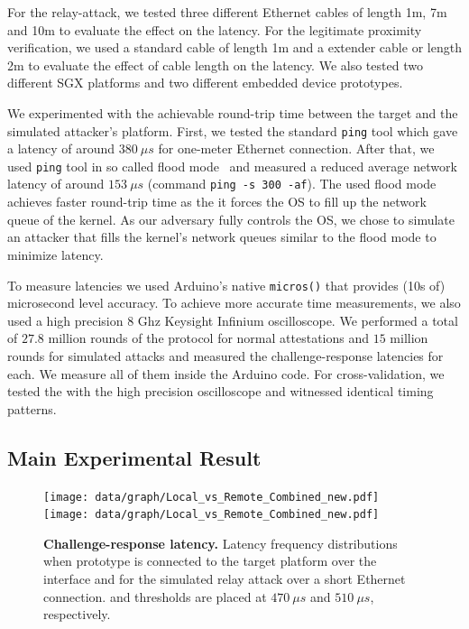 For the relay-attack, we tested three different Ethernet cables of length 1m, 7m and 10m to evaluate the effect on the latency. For the legitimate proximity verification, we used a standard \usb cable of length 1m and a \usb extender cable or length 2m to evaluate the effect of \usb cable length on the latency. We also tested two different SGX platforms and two different embedded device prototypes.

We experimented with the achievable round-trip time between the target and the simulated attacker's platform. First, we tested the standard \texttt{ping} tool which gave a latency of around $380\ \mu s$ for one-meter Ethernet connection. After that, we used \texttt{ping} tool in so called flood mode~\cite{ping} and measured a reduced average network latency of around $153\ \mu s$ (command \texttt{ping -s 300 -af}). The used flood mode achieves faster round-trip time as the it forces the OS to fill up the network queue of the kernel. As our adversary fully controls the OS, we chose to simulate an attacker that fills the kernel's network queues similar to the flood mode to minimize latency.

To measure latencies we used Arduino's native \texttt{micros()} that provides (10s of) microsecond level accuracy. To achieve more accurate time measurements, we also used a high precision 8 Ghz Keysight Infinium oscilloscope. We performed a total of $27.8$ million rounds of the protocol for normal attestations and $15$ million rounds for simulated attacks and measured the challenge-response latencies for each. We measure all of them inside the Arduino code. For cross-validation, we tested the \device with the high precision oscilloscope and witnessed identical timing patterns.

\ifusenix
\vspace{-5pt}
\else
\fi
\subsection{Main Experimental Result}
\label{sec:evaluation:results}


\begin{figure}[t]
  \centering
    \ifusenix
    \texttt{[image: data/graph/Local\_vs\_Remote\_Combined\_new.pdf]}
    \else
    \texttt{[image: data/graph/Local\_vs\_Remote\_Combined\_new.pdf]}
    \fi
    \caption{\textbf{Challenge-response latency.} Latency frequency distributions when \device prototype is connected to the target platform over the \usb interface and for the simulated relay attack over a short Ethernet connection. \connect and \detach thresholds are placed at $470\ \mu s$ and $510\ \mu s$, respectively.}
    \vspace{-10pt}
    \label{graph:reroutingDetectionHist}
\end{figure}



